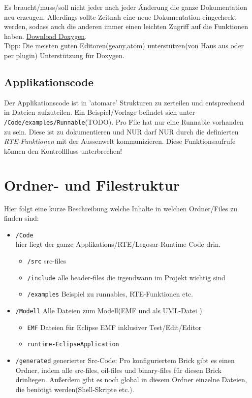 \documentclass[]{scrartcl}
\begin{document}
Es braucht/muss/soll nicht jeder nach jeder Änderung die ganze Dokumentation neu erzeugen. Allerdings sollte Zeitnah eine neue Dokumentation eingecheckt werden, sodass auch die anderen immer einen leichten Zugriff auf die Funktionen haben. \href{http://www.stack.nl/~dimitri/doxygen/download.html}{Download Doxygen}.\\
Tipp: Die meisten guten Editoren(geany,atom) unterstützen(von Haus aus oder per plugin) Unterstützung für Doxygen.

\subsection{Applikationscode}
Der Applikationscode ist in 'atomare' Strukturen zu zerteilen und entsprechend in Dateien aufzuteilen. Ein Beispiel/Vorlage befindet sich unter \lstinline|/Code/examples/Runnable|(TODO).
Pro File hat nur eine Runnable vorhanden zu sein. Diese ist zu dokumentieren und NUR darf NUR durch die definierten \textit{RTE-Funktionen} mit der Aussenwelt kommunizieren. Diese Funktionsaufrufe können den Kontrollfluss unterbrechen!

\section{Ordner- und Filestruktur}
Hier folgt eine kurze Beschreibung welche Inhalte in welchen Ordner/Files zu finden sind:
\begin{itemize}
\item \lstinline|/Code|\\
	hier liegt der ganze Applikations/RTE/Legosar-Runtime Code drin. 
	\begin{itemize}
	\item \lstinline|/src| src-files
	\item \lstinline|/include| alle header-files die irgendwann im Projekt wichtig sind
	\item \lstinline|/examples| Beispiel zu runnables, RTE-Funktionen etc.
	\end{itemize}
\item \lstinline|/Modell| Alle Dateien zum Modell(EMF und als UML-Datei	)
	\begin{itemize}
	\item \lstinline|EMF| Dateien für Eclipse EMF inklusiver Test/Edit/Editor
	\item \lstinline|runtime-EclipseApplication|
	\end{itemize}
\item \lstinline|/generated| generierter Src-Code: Pro konfiguriertem Brick gibt es einen Ordner, indem alle src-files, oil-files und binary-files für diesen Brick drinliegen. Außerdem gibt es noch global in diesem Ordner einzelne Dateien, die benötigt werden(Shell-Skripte etc.).
\end{itemize}
\end{document}
